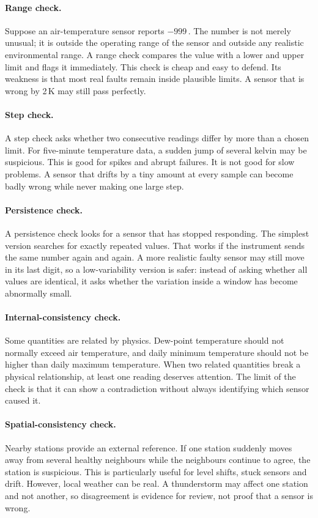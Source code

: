 \paragraph{Range check.}
Suppose an air-temperature sensor reports $-999$\,\textcelsius. The number
is not merely unusual; it is outside the operating range of the sensor and
outside any realistic environmental range. A range check compares the value
with a lower and upper limit and flags it immediately. This check is cheap
and easy to defend. Its weakness is that most real faults remain inside
plausible limits. A sensor that is wrong by 2\,K may still pass perfectly.

\paragraph{Step check.}
A step check asks whether two consecutive readings differ by more than a
chosen limit. For five-minute temperature data, a sudden jump of several
kelvin may be suspicious. This is good for spikes and abrupt failures. It is
not good for slow problems. A sensor that drifts by a tiny amount at every
sample can become badly wrong while never making one large step.

\paragraph{Persistence check.}
A persistence check looks for a sensor that has stopped responding. The
simplest version searches for exactly repeated values. That works if the
instrument sends the same number again and again. A more realistic faulty
sensor may still move in its last digit, so a low-variability version is
safer: instead of asking whether all values are identical, it asks whether
the variation inside a window has become abnormally small.

\paragraph{Internal-consistency check.}
Some quantities are related by physics. Dew-point temperature should not
normally exceed air temperature, and daily minimum temperature should not be
higher than daily maximum temperature. When two related quantities break a
physical relationship, at least one reading deserves attention. The limit
of the check is that it can show a contradiction without always identifying
which sensor caused it.

\paragraph{Spatial-consistency check.}
Nearby stations provide an external reference. If one station suddenly moves
away from several healthy neighbours while the neighbours continue to agree,
the station is suspicious. This is particularly useful for level shifts,
stuck sensors and drift. However, local weather can be real. A thunderstorm
may affect one station and not another, so disagreement is evidence for
review, not proof that a sensor is wrong.

